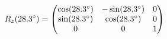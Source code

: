 \documentclass[preview]{standalone}
\begin{document}
\begin{align*}
\special{dvisvgm:raw <g id='unique000'>}R_z(28.3^\circ) = \begin{pmatrix} \cos(28.3^\circ) & -\sin(28.3^\circ) & 0 \\ \sin(28.3^\circ) & \cos(28.3^\circ) & 0 \\ 0 & 0 & 1 \end{pmatrix}\special{dvisvgm:raw </g>}
\end{align*}
\end{document}
